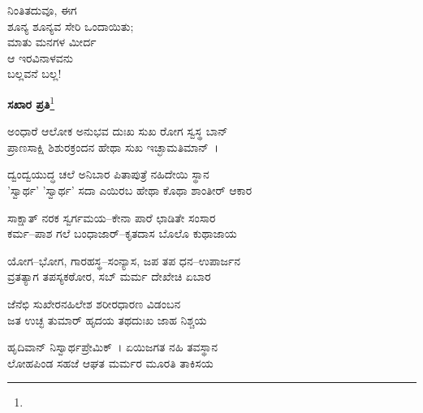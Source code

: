 \begin{myquote}
ನಿಂತಿತದುವೂ, ಈಗ\\ಶೂನ್ಯ ಶೂನ್ಯವ ಸೇರಿ ಒಂದಾಯಿತು;\\ಮಾತು ಮನಗಳ ಮೀರ್ದ\\ಆ ಇರವಿನಾಳವನು\\ಬಲ್ಲವನೆ ಬಲ್ಲ!
\end{myquote}

\begin{center}
\textbf{ಸಖಾರ ಪ್ರತಿ}\footnote{}
\end{center}

\begin{myquote}
ಅಂಧಾರೆ ಆಲೋಕ ಅನುಭವ ದುಃಖ ಸುಖ ರೋಗ ಸ್ವಸ್ಥ ಬಾನ್\\ಪ್ರಾಣಸಾಕ್ಷಿ ಶಿಶುರಕ್ರಂದನ ಹೇಥಾ ಸುಖ ಇಚ್ಛಾಮತಿಮಾನ್~।
\end{myquote}


\begin{myquote}
ದ್ವಂದ್ವಯುದ್ಧ ಚಲೆ ಅನಿಬಾರ ಪಿತಾಪುತ್ರೆ ನಹಿದೇಯಿ ಸ್ಥಾನ\\'ಸ್ವಾರ್ಥ' 'ಸ್ವಾರ್ಥ' ಸದಾ ಎಯಿರಬ ಹೇಥಾ ಕೊಥಾ ಶಾಂತೀರ್ ಆಕಾರ
\end{myquote}


\begin{myquote}
ಸಾಕ್ಷಾತ್ ನರಕ ಸ್ವರ್ಗಮಯ–ಕೇನಾ ಪಾರೆ ಛಾಡಿತೇ ಸಂಸಾರ\\ಕರ್ಮ–ಪಾಶ ಗಲೆ ಬಂಧಾಜಾರ್–ಕೃತದಾಸ ಬೊಲೊ ಕುಥಾಜಾಯ
\end{myquote}


\begin{myquote}
ಯೋಗ–ಭೋಗ, ಗಾರಹಸ್ಥ–ಸಂನ್ಯಾಸ, ಜಪ ತಪ ಧನ–ಉಪಾರ್ಜನ\\ವ್ರತತ್ಯಾಗ ತಪಸ್ಯಕಠೋರ, ಸಬ್ ಮರ್ಮ ದೇಖೇಚಿ ಏಬಾರ
\end{myquote}


\begin{myquote}
ಜೆನೆಛಿ ಸುಖೇರನಹಿಲೇಶ ಶರೀರಧಾರಣ ವಿಡಂಬನ\\ಜತ ಉಚ್ಛ ತುಮಾರ್‌ ಹೃದಯ ತಥದುಃಖ ಜಾಹ ನಿಶ್ಚಯ
\end{myquote}


\begin{myquote}
ಹೃದಿವಾನ್ ನಿಸ್ವಾರ್ಥಪ್ರೇಮಿಕ್~। ಏಯಿಜಗತ ನಹಿ ತವಸ್ಥಾನ\\ಲೋಹಪಿಂಡ ಸಹಜೆ ಆಘತ ಮರ್ಮರ ಮೂರತಿ ತಾಕಿಸಯ
\end{myquote}


